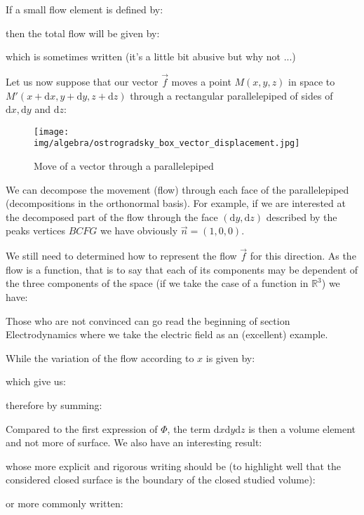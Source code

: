 	If a small flow element is defined by:
	
	then the total flow will be given by:
	
	which is sometimes written (it's a little bit abusive but why not ...)
	
	Let us now suppose that our vector $\vec{f}$ moves a point $M(x,y,z)$ in space to  $M'(x+\mathrm{d}x,y+\mathrm{d}y,z+\mathrm{d}z)$ through a rectangular parallelepiped of sides of $\mathrm{d}x, \mathrm{d}y$ and $\mathrm{d}z$:
	
	\begin{figure}[H]
		\centering
		\texttt{[image: img/algebra/ostrogradsky\_box\_vector\_displacement.jpg]}
		\caption[]{Move of a vector through a parallelepiped}
	\end{figure}
	We can decompose the movement (flow) through each face of the parallelepiped (decompositions in the orthonormal basis). For example, if we are interested at the decomposed part of the flow through the face $(\mathrm{d}y, \mathrm{d}z)$ described by the peaks vertices $BCFG$ we have obviously $\vec{n}=(1,0,0)$.
	
	We still need to determined how to represent the flow $\vec{f}$ for this direction. As the flow is a function, that is to say that each of its components may be dependent of the three components of the space (if we take the case of a function in $\mathbb{R}^3$) we have:
	
	\begin{tcolorbox}[title=Remark,colframe=black,arc=10pt]
	Those who are not convinced can go read the beginning of section Electrodynamics where we take the electric field as an (excellent) example.
	\end{tcolorbox}	
	While the variation of the flow according to $x$ is given by:
	
	which give us:
	
	therefore by summing:
	
	Compared to the first expression of $\Phi$, the term $\mathrm{d}x\mathrm{d}y\mathrm{d}z$ is then a volume element and not more of surface. We also have an interesting result:
	
	whose more explicit and rigorous writing  should be (to highlight well that the considered closed surface is the boundary of the closed studied volume):
	
	or more commonly written:
	
